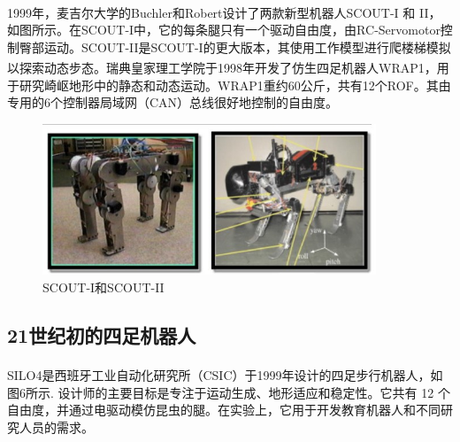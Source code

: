 \documentclass[12pt,a4paper]{ctexart}
\newcommand{\supercite}[1]{\textsuperscript{\cite{#1}}}
\begin{document}
1999年，麦吉尔大学的Buchler和Robert设计了两款新型机器人SCOUT-I 和 II\supercite{16}\supercite{17}，如图所示。在SCOUT-I中，它的每条腿只有一个驱动自由度，由RC-Servomotor控制臀部运动。SCOUT-II是SCOUT-I的更大版本，其使用工作模型进行爬楼梯模拟以探索动态步态。瑞典皇家理工学院于1998年开发了仿生四足机器人WRAP1\supercite{18}，用于研究崎岖地形中的静态和动态运动。WRAP1重约60公斤，共有12个ROF。其由专用的6个控制器局域网（CAN）总线很好地控制的自由度。
\begin{figure}[H]
    \centering
    \includegraphics[height=4.5cm]{IMG_05.jpg}
    \caption{SCOUT-I和SCOUT-II}
\end{figure}
\subsection{21世纪初的四足机器人}
SILO4是西班牙工业自动化研究所（CSIC）于1999年设计的四足步行机器人\supercite{19}，如图6所示. 设计师的主要目标是专注于运动生成、地形适应和稳定性。它共有 12 个自由度，并通过电驱动模仿昆虫的腿。在实验上，它用于开发教育机器人和不同研究人员的需求。
\end{document}
